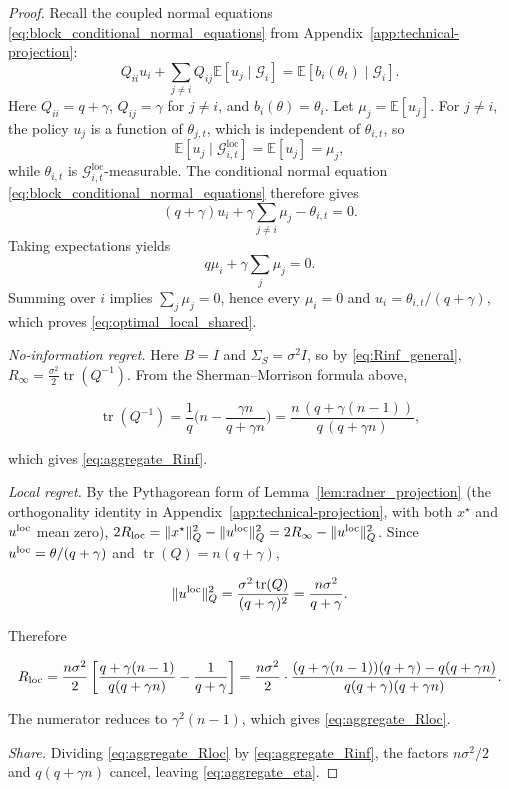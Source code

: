 \begin{proof}
Recall the coupled normal equations \eqref{eq:block_conditional_normal_equations}
from Appendix~\ref{app:technical-projection}:
\[
 Q_{ii}u_i+\sum_{j\ne i}Q_{ij}\mathbb E[u_j\mid\mathcal G_i]
 =\mathbb E[b_i(\theta_t)\mid\mathcal G_i].
\]
Here $Q_{ii}=q+\gamma$, $Q_{ij}=\gamma$ for $j\ne i$, and $b_i(\theta)=\theta_i$.
Let $\mu_j=\mathbb E[u_j]$. For $j\ne i$, the policy $u_j$ is a function of $\theta_{j,t}$,
which is independent of $\theta_{i,t}$, so
\[
\mathbb E[u_j\mid\mathcal G^{\mathrm{loc}}_{i,t}]
=\mathbb E[u_j]=\mu_j,
\]
while $\theta_{i,t}$ is
$\mathcal G^{\mathrm{loc}}_{i,t}$-measurable. The conditional normal equation
\eqref{eq:block_conditional_normal_equations} therefore gives
\[
(q+\gamma)u_i
+\gamma\sum_{j\ne i}\mu_j
-\theta_{i,t}=0.
\]
Taking expectations yields
\[
q\mu_i+\gamma\sum_j\mu_j=0.
\]
Summing over $i$ implies $\sum_j\mu_j=0$, hence every $\mu_i=0$ and
$u_i=\theta_{i,t}/(q+\gamma)$, which proves
\eqref{eq:optimal_local_shared}.

\emph{No-information regret.} Here $B=I$ and $\Sigma_S=\sigma^2I$, so by \eqref{eq:Rinf_general}, $R_\infty=\tfrac{\sigma^2}2\operatorname{tr}(Q^{-1})$. From the Sherman--Morrison formula above,

\[
\operatorname{tr}(Q^{-1})=\frac1q\Big(n-\frac{\gamma n}{q+\gamma n}\Big)=\frac{n\,(q+\gamma(n-1))}{q\,(q+\gamma n)},
\]

which gives \eqref{eq:aggregate_Rinf}.

\emph{Local regret.} By the Pythagorean form of Lemma~\ref{lem:radner_projection} (the orthogonality identity in Appendix~\ref{app:technical-projection}, with both $x^\star$ and $u^{\rm loc}$ mean zero), $2R_{\rm loc}=\|x^\star\|_Q^2-\|u^{\rm loc}\|_Q^2=2R_\infty-\|u^{\rm loc}\|_Q^2$. Since $u^{\rm loc}=\theta/(q+\gamma)$ and $\operatorname{tr}(Q)=n(q+\gamma)$,

\[
\|u^{\rm loc}\|_Q^2=\frac{\sigma^2\operatorname{tr}(Q)}{(q+\gamma)^2}=\frac{n\sigma^2}{q+\gamma}.
\]

Therefore

\[
R_{\rm loc}=\frac{n\sigma^2}{2}\left[\frac{q+\gamma(n-1)}{q(q+\gamma n)}-\frac{1}{q+\gamma}\right]=\frac{n\sigma^2}{2}\cdot\frac{(q+\gamma(n-1))(q+\gamma)-q(q+\gamma n)}{q(q+\gamma)(q+\gamma n)} .
\]

The numerator reduces to $\gamma^2(n-1)$, which gives \eqref{eq:aggregate_Rloc}.

\emph{Share.} Dividing \eqref{eq:aggregate_Rloc} by \eqref{eq:aggregate_Rinf}, the factors $n\sigma^2/2$ and $q(q+\gamma n)$ cancel, leaving \eqref{eq:aggregate_eta}.

\end{proof}

